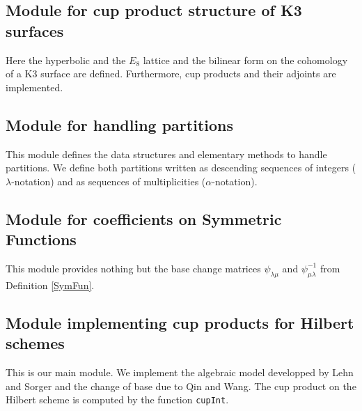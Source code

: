 \subsection{Module for cup product structure of K3 surfaces} 
Here the hyperbolic and the $E_8$ lattice and the bilinear form on the cohomology of a K3 surface are defined. Furthermore, cup products and their adjoints are implemented.

\subsection{Module for handling partitions} 
This module defines the data structures and elementary methods to handle partitions. We define both partitions written as descending sequences of integers ($\lambda$-notation) and as sequences of multiplicities ($\alpha$-notation).

\subsection{Module for coefficients on Symmetric Functions} 
This module provides nothing but the base change matrices $\psi_{\lambda\mu}$ and $\psi^{-1}_{\mu\lambda}$ from Definition \ref{SymFun}.
 
\subsection{Module implementing cup products for Hilbert schemes} This is our main module. We implement the algebraic model developped by Lehn and Sorger and the change of base due to Qin and Wang. The cup product on the Hilbert scheme is computed by the function \texttt{cupInt}.

 
